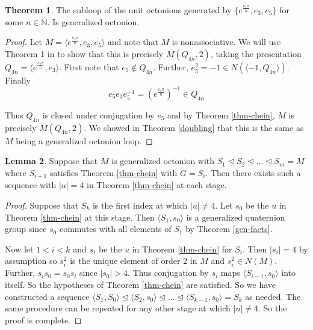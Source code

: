 \documentclass[12pt]{report}
\theoremstyle{definition}
\newtheorem{thm}{Theorem}[chapter]
\newtheorem{lem}[thm]{Lemma}
\newcommand{\NNN}{\mathbb{N}}
\begin{document}
\begin{thm}
  The subloop of the unit octonions generated by $\{e^{\frac{e_2\pi}{n}}, e_3, e_5\}$ for some $n\in\NNN$.
    Is generalized octonion.
\end{thm}

\begin{proof}
  Let $M = \langle e^{\frac{e_2\pi}{n}}, e_3, e_5\rangle$ and note that $M$ is nonassociative. We will use
    Theorem 1 in \cite{Chein} to show that this is precisely $M(Q_{4n}, 2)$, taking the presentation
    $Q_{4n}  = \langle e^{\frac{e_2\pi}{n}}, e_3\rangle$. First note that $e_5\notin Q_{4n}$. Further,
    $e_5^2 = -1\in N(\langle -1, Q_{4n}\rangle)$. Finally
	\[e_5 e_3 e_5^{-1} = (e^{\frac{e_2\pi}{n}})^{-1}\in Q_{4n}\]

  Thus $Q_{4n}$ is closed under conjugation by $e_5$ and by Theorem \ref{thm-chein}, $M$ is precisely
    $M(Q_{4n}, 2)$. We showed in Theorem \ref{doubling} that this is the same as $M$ being a generalized
    octonion loop.
\end{proof}

\begin{lem}\label{u-order-4}
  Suppose that $M$ is generalized octonion with $S_1\unlhd S_2\unlhd\ldots\unlhd S_m = M$ where $S_{i + 1}$
    satisfies Theorem \ref{thm-chein} with $G = S_i$. Then there exists such a sequence with $|u| = 4$ in
    Theorem \ref{thm-chein} at each stage.
\end{lem}

\begin{proof}
  Suppose that $S_k$ is the first index at which $|u|\neq 4$. Let $s_0$ be the $u$ in Theorem \ref{thm-chein}
    at this stage. Then $\langle S_1, s_0\rangle$ is a generalized quaternion group since $s_0$ commutes
    with all elements of $S_1$ by Theorem \ref{gen-facts}.

  Now let $1 < i < k$ and $s_i$ be the $u$ in Theorem \ref{thm-chein} for $S_i$. Then $|s_i| = 4$ by assumption
    so $s_i^2$ is the unique element of order $2$ in $M$ and $s_i^2\in N(M)$. Further, $s_i s_0 = s_0 s_i$ since
    $|s_0| > 4$. Thus conjugation by $s_i$ maps $\langle S_{i - 1}, s_0\rangle$ into itself. So the hypotheses
    of Theorem \ref{thm-chein} are satisfied. So we have constructed a sequence
    $\langle S_1, S_0\rangle\unlhd \langle S_2, s_0\rangle\unlhd \ldots \unlhd \langle S_{k - 1}, s_0\rangle = S_k$
    as needed. The same procedure can be repeated for any other stage at which $|u| \neq 4$. So the proof is complete.
\end{proof}
\end{document}
